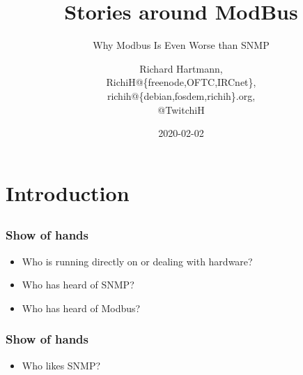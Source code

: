 \documentclass[aspectratio=169]{beamer}
\title{Stories around ModBus}
\subtitle{Why Modbus Is Even Worse than SNMP}
\author{Richard Hartmann,\\
RichiH@\{freenode,OFTC,IRCnet\},\\
richih@\{debian,fosdem,richih\}.org,\\
@TwitchiH}
\date{2020-02-02}
\begin{document}
\section{Introduction}


\subsection{}

\begin{frame}
	\titlepage
\end{frame}


\begin{frame}
	\frametitle{Show of hands}
	\begin{itemize}
		\item Who is running directly on or dealing with hardware?
		\item Who has heard of SNMP?
		\item Who has heard of Modbus?
	\end{itemize}
\end{frame}

\begin{frame}
	\frametitle{Show of hands}
	\begin{itemize}
		\item Who likes SNMP?
	\end{itemize}
\end{frame}
\end{document}

